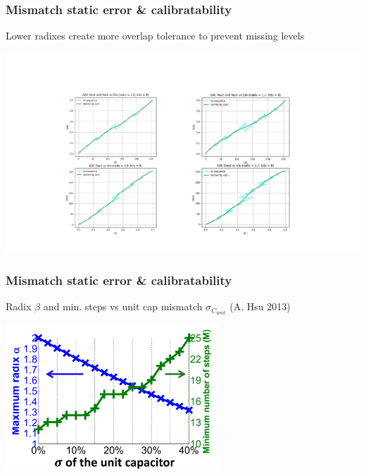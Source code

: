 \documentclass[aspectratio=169]{beamer}
\begin{document}
\begin{frame}
  \frametitle{Mismatch static error \& calibratability}
    Lower radixes create more overlap tolerance to prevent missing levels
    \begin{center}
    \includegraphics[width=\textwidth]{overlap.pdf}
    \end{center}
  \end{frame}

\begin{frame}
\frametitle{Mismatch static error \& calibratability}
  Radix $\beta$ and min. steps vs unit cap mismatch $\sigma_{C_{unit}}$ (A. Hsu 2013)
  \begin{center}
  \includegraphics[width=0.6\textwidth]{mismatch_vs_radix.png}
  \end{center}
\end{frame}

\end{document}
